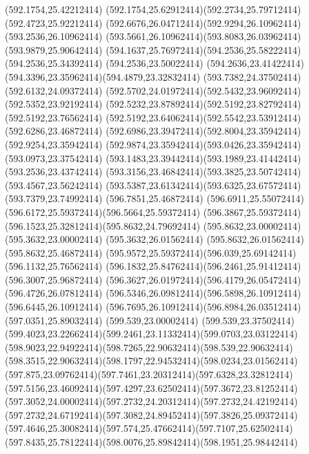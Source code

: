 {{	\lineto(592.1754,25.42212414)
	\curveto(592.1754,25.62912414)(592.2734,25.79712414)(592.4723,25.92212414)
	\curveto(592.6676,26.04712414)(592.9294,26.10962414)(593.2536,26.10962414)
	\curveto(593.5661,26.10962414)(593.8083,26.03962414)(593.9879,25.90642414)
	\curveto(594.1637,25.76972414)(594.2536,25.58222414)(594.2536,25.34392414)
	\lineto(594.2536,23.50022414)
	\curveto(594.2636,23.41422414)(594.3396,23.35962414)(594.4879,23.32832414)
	\closepath
	\moveto(593.7382,24.37502414)
	\lineto(592.6132,24.09372414)
	\curveto(592.5702,24.01972414)(592.5432,23.96092414)(592.5352,23.92192414)
	\curveto(592.5232,23.87892414)(592.5192,23.82792414)(592.5192,23.76562414)
	\curveto(592.5192,23.64062414)(592.5542,23.53912414)(592.6286,23.46872414)
	\curveto(592.6986,23.39472414)(592.8004,23.35942414)(592.9254,23.35942414)
	\curveto(592.9874,23.35942414)(593.0426,23.35942414)(593.0973,23.37542414)
	\curveto(593.1483,23.39442414)(593.1989,23.41442414)(593.2536,23.43742414)
	\curveto(593.3156,23.46842414)(593.3825,23.50742414)(593.4567,23.56242414)
	\curveto(593.5387,23.61342414)(593.6325,23.67572414)(593.7379,23.74992414)
	\closepath
	\moveto(596.7851,25.46872414)
	\curveto(596.6911,25.55072414)(596.6172,25.59372414)(596.5664,25.59372414)
	\curveto(596.3867,25.59372414)(596.1523,25.32812414)(595.8632,24.79692414)
	\lineto(595.8632,23.00002414)
	\lineto(595.3632,23.00002414)
	\lineto(595.3632,26.01562414)
	\lineto(595.8632,26.01562414)
	\lineto(595.8632,25.46872414)
	\curveto(595.9572,25.59372414)(596.039,25.69142414)(596.1132,25.76562414)
	\curveto(596.1832,25.84762414)(596.2461,25.91412414)(596.3007,25.96872414)
	\curveto(596.3627,26.01972414)(596.4179,26.05472414)(596.4726,26.07812414)
	\curveto(596.5346,26.09812414)(596.5898,26.10912414)(596.6445,26.10912414)
	\curveto(596.7695,26.10912414)(596.8984,26.03512414)(597.0351,25.89032414)
	\closepath
	\moveto(599.539,23.00002414)
	\lineto(599.539,23.37502414)
	\curveto(599.4023,23.22662414)(599.2461,23.11332414)(599.0703,23.03122414)
	\curveto(598.9023,22.94922414)(598.7265,22.90632414)(598.539,22.90632414)
	\curveto(598.3515,22.90632414)(598.1797,22.94532414)(598.0234,23.01562414)
	\curveto(597.875,23.09762414)(597.7461,23.20312414)(597.6328,23.32812414)
	\curveto(597.5156,23.46092414)(597.4297,23.62502414)(597.3672,23.81252414)
	\curveto(597.3052,24.00002414)(597.2732,24.20312414)(597.2732,24.42192414)
	\curveto(597.2732,24.67192414)(597.3082,24.89452414)(597.3826,25.09372414)
	\curveto(597.4646,25.30082414)(597.574,25.47662414)(597.7107,25.62502414)
	\curveto(597.8435,25.78122414)(598.0076,25.89842414)(598.1951,25.98442414)
}}
